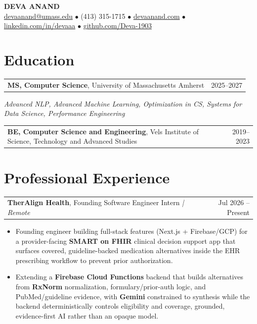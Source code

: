 \documentclass[letterpaper,11pt]{article}
\makeatletter
\newcommand{\eduItem}[3]{%
  \begin{tabular*}{\textwidth}{@{}l@{\extracolsep{\fill}}r@{}}
    \textbf{#1}, #2 & #3 \\
  \end{tabular*}\par
}
\newcommand{\expItem}[4]{%
  \vspace{2pt}
  \begin{tabular*}{\textwidth}{@{}l@{\extracolsep{\fill}}r@{}}
    \textbf{#1}, #2 \textit{| #3} & #4 \\
  \end{tabular*}\par\vspace{-3pt}
}
\makeatother
\begin{document}
\begin{center}
    {\fontsize{18}{20}\selectfont\bfseries DEVA ANAND}\\ \vspace{3pt}
    {\small
    \href{mailto:devaanand@umass.edu}{devaanand@umass.edu}
    \enspace$\bullet$\enspace
    (413) 315-1715
    \enspace$\bullet$\enspace
    \href{https://devaanand.com}{devaanand.com}
    \enspace$\bullet$\enspace
    \href{https://linkedin.com/in/devaaa/}{linkedin.com/in/devaaa}
    \enspace$\bullet$\enspace
    \href{https://github.com/Deva-1903}{github.com/Deva-1903}}
\end{center}
\vspace{-8pt}

\section{Education}
\eduItem{MS, Computer Science}{University of Massachusetts Amherst}{2025--2027}
{\small\textit{Advanced NLP, Advanced Machine Learning, Optimization in CS, Systems for Data Science, Performance Engineering}}\par
\vspace{3pt}
\eduItem{BE, Computer Science and Engineering}{Vels Institute of Science, Technology and Advanced Studies}{2019--2023}

\section{Professional Experience}

\expItem{TherAlign Health}{Founding Software Engineer Intern}{Remote}{Jul 2026 -- Present}
\begin{itemize}
  \item Founding engineer building full-stack features (Next.js + Firebase/GCP) for a provider-facing \textbf{SMART on FHIR} clinical decision support app that surfaces covered, guideline-backed medication alternatives inside the EHR prescribing workflow to prevent prior authorization.
  \item Extending a \textbf{Firebase Cloud Functions} backend that builds alternatives from \textbf{RxNorm} normalization, formulary/prior-auth logic, and PubMed/guideline evidence, with \textbf{Gemini} constrained to synthesis while the backend deterministically controls eligibility and coverage, grounded, evidence-first AI rather than an opaque model.
\end{itemize}
\end{document}
